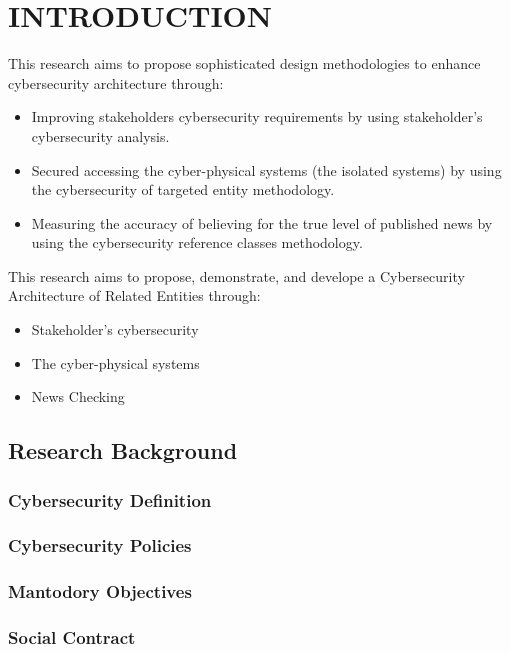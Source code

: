 \chapter{INTRODUCTION}

\if 
This research aims to propose sophisticated design methodologies to enhance cybersecurity architecture through:
\begin{itemize}
\item Improving stakeholders cybersecurity requirements by using stakeholder's cybersecurity analysis.
\item Secured accessing
the cyber-physical systems (the isolated systems) by using the cybersecurity of targeted entity methodology.
\item Measuring the accuracy of believing for the true level of published news by using the cybersecurity reference classes methodology. 
\end{itemize} \fi
\if
This research aims to propose,  demonstrate, and develope a Cybersecurity Architecture of Related Entities through:
\begin{itemize}
\item Stakeholder's cybersecurity  %
\item  The cyber-physical systems %
\item  News Checking %
\end{itemize}
\fi


\section{Research Background}
\subsection{Cybersecurity Definition}
\subsection{Cybersecurity Policies}
\subsection{Mantodory Objectives}
\subsection{Social Contract}

